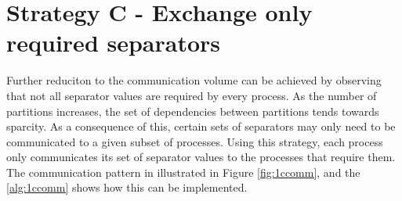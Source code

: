 



\section{Strategy C - Exchange only required separators}
Further reduciton to the communication volume can be achieved by observing that not all separator values are required by every process. As the number of partitions increases, the set of dependencies between partitions tends towards sparcity. As a consequence of this, certain sets of separators may only need to be communicated to a given subset of processes. Using this strategy, each process only communicates its set of separator values to the processes that require them. The communication pattern in illustrated in Figure \ref{fig:1ccomm}, and the \autoref{alg:1ccomm} shows how this can be implemented.


